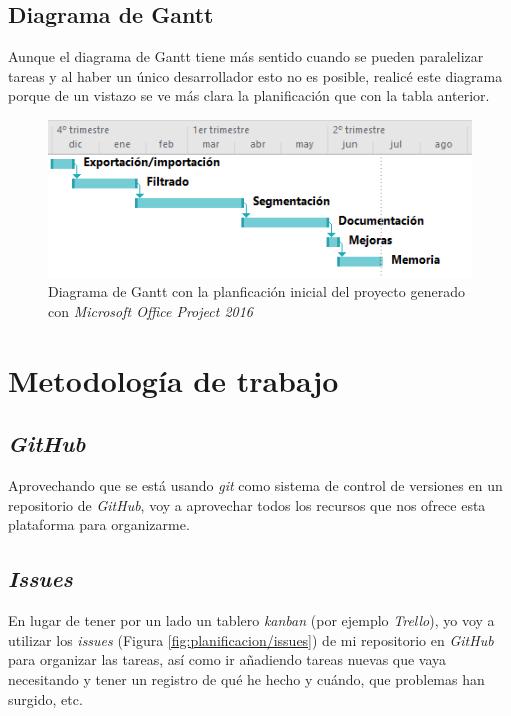 \subsection{Diagrama de Gantt}

Aunque el diagrama de Gantt tiene más sentido cuando se pueden paralelizar tareas y al haber un único desarrollador esto no es posible, realicé este diagrama porque de un vistazo se ve más clara la planificación que con la tabla anterior.

\begin{figure}[H]
	\centering
	\includegraphics[width=12cm]{imagenes/planificacion/gantt}
	\caption{Diagrama de Gantt con la planficación inicial del proyecto generado con \textit{Microsoft Office Project 2016}}
	\label{fig:planificacion/gantt}
\end{figure}


\section{Metodología de trabajo}

\subsection{\textit{GitHub}}

Aprovechando que se está usando \textit{git} como sistema de control de versiones en un repositorio de \textit{GitHub}, voy a aprovechar todos los recursos que nos ofrece esta plataforma para organizarme. 

\subsection{\textit{Issues}}

En lugar de tener por un lado un tablero \textit{kanban} (por ejemplo \textit{Trello}), yo voy a utilizar los \textit{issues} (Figura \ref{fig:planificacion/issues}) de mi repositorio en \textit{GitHub} para organizar las tareas, así como ir añadiendo tareas nuevas que vaya necesitando y tener un registro de qué he hecho y cuándo, que problemas han surgido, etc.

